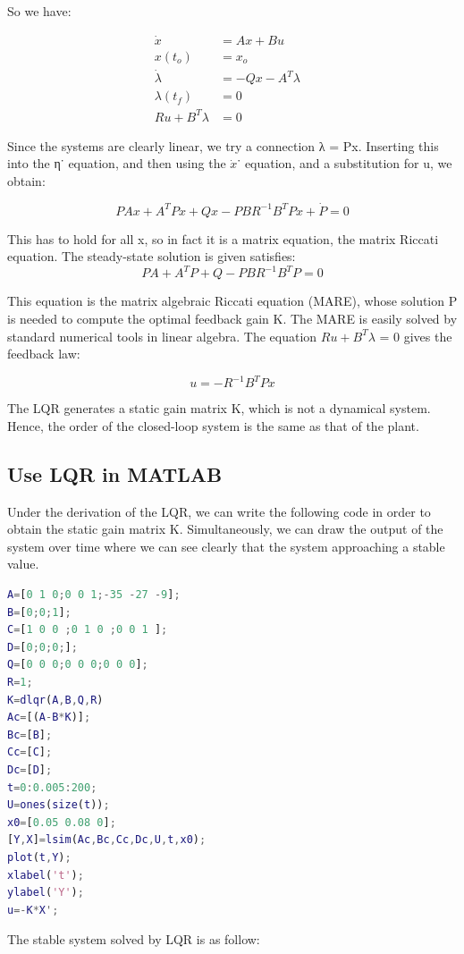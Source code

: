 \documentclass{mcmthesis}
\begin{document}
So we have:

$$\begin{aligned}
\dot{x} &=A x+B u \\
x\left(t_{o}\right) &=x_{o} \\
\dot{\lambda}&=-Q x-A^{T} \lambda & \\
\lambda\left(t_{f}\right) &=0 \\
R u+B^{T} \lambda &=0
\end{aligned}$$

Since the systems are clearly linear, we try a connection λ = Px. Inserting this into the η˙
equation, and then using the $\dot{x}$˙ equation, and a substitution for u, we obtain:

$$P A x+A^{T} P x+Q x-P B R^{-1} B^{T} P x+\dot{P}=0$$

This has to hold for all x, so in fact it is a matrix equation, the matrix Riccati equation.
The steady-state solution is given satisfies:
$$P A+A^{T} P+Q-P B R^{-1} B^{T} P=0$$

This equation is the matrix algebraic Riccati equation (MARE), whose solution P is needed
to compute the optimal feedback gain K. The MARE is easily solved by standard numerical
tools in linear algebra.
The equation $Ru + B^T \lambda$ = 0 gives the feedback law:

$$u = −R^{−1}B^{T}Px$$

The LQR generates a static gain matrix K, which is not a dynamical system.\cite{conf/rait/BhushanCS16}
Hence, the order of the closed-loop system is the same as that of the plant.
\subsection{Use LQR in MATLAB}
Under the derivation of the LQR, we can write the following code in order to obtain the static gain matrix K. Simultaneously, we can draw the output of the system over time where we can see clearly that the system approaching a stable value.

\begin{lstlisting}[language=MATLAB, caption=LQR in MATLAB]
A=[0 1 0;0 0 1;-35 -27 -9];
B=[0;0;1];
C=[1 0 0 ;0 1 0 ;0 0 1 ];
D=[0;0;0;];
Q=[0 0 0;0 0 0;0 0 0];
R=1;
K=dlqr(A,B,Q,R)
Ac=[(A-B*K)];
Bc=[B];
Cc=[C];
Dc=[D];
t=0:0.005:200;
U=ones(size(t));
x0=[0.05 0.08 0];
[Y,X]=lsim(Ac,Bc,Cc,Dc,U,t,x0);
plot(t,Y);
xlabel('t');
ylabel('Y');
u=-K*X';
\end{lstlisting}

The stable system solved by LQR is as follow:
\end{document}
